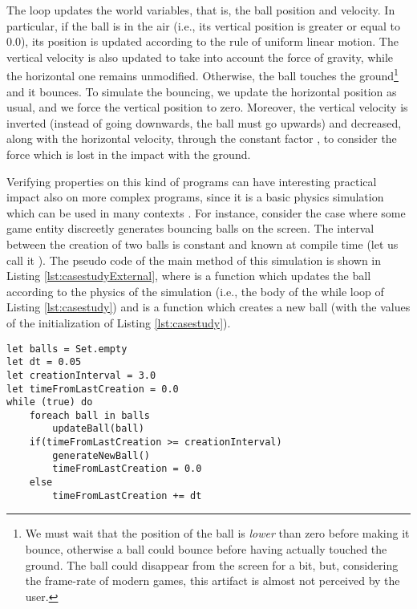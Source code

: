 The  loop updates the world variables, that is, the ball position and velocity. In particular, if the ball is in the air (i.e., its vertical position is greater or equal to $0.0$), its position is updated according to the rule of uniform linear motion. The vertical velocity is also updated to take into account the force of gravity, while the horizontal one remains unmodified. Otherwise, the ball touches the ground\footnote{We must wait that the position of the ball is \emph{lower} than zero before making it bounce, otherwise a ball could bounce before having actually touched the ground. The ball could disappear from the screen for a bit, but, considering the frame-rate of modern games, this artifact is almost not perceived by the user.} and it bounces. To simulate the bouncing, we update the horizontal position as usual, and we force the vertical position to zero. Moreover, the vertical velocity is inverted (instead of going downwards, the ball must go upwards) and decreased, along with the horizontal velocity, through the constant factor , to consider the force which is lost in the impact with the ground. 

Verifying properties on this kind of programs can have interesting practical impact also on more complex programs, since it is a basic physics simulation which can be used in many contexts \cite{E10}. For instance, consider the case where some game entity discreetly generates bouncing balls on the screen. The interval between the creation of two balls is constant and known at compile time (let us call it ). The pseudo code of the main method of this simulation is shown in Listing \ref{lst:casestudyExternal}, where  is a function which updates the ball  according to the physics of the simulation (i.e., the body of the while loop of Listing \ref{lst:casestudy}) and  is a function which creates a new ball (with the values of the initialization of Listing \ref{lst:casestudy}).

\begin{lstlisting}[caption={Bouncing ball generation},label={lst:casestudyExternal}]
let balls = Set.empty
let dt = 0.05
let creationInterval = 3.0
let timeFromLastCreation = 0.0
while (true) do
	foreach ball in balls
		updateBall(ball)	
	if(timeFromLastCreation >= creationInterval)
		generateNewBall()
		timeFromLastCreation = 0.0
	else
		timeFromLastCreation += dt
\end{lstlisting}

